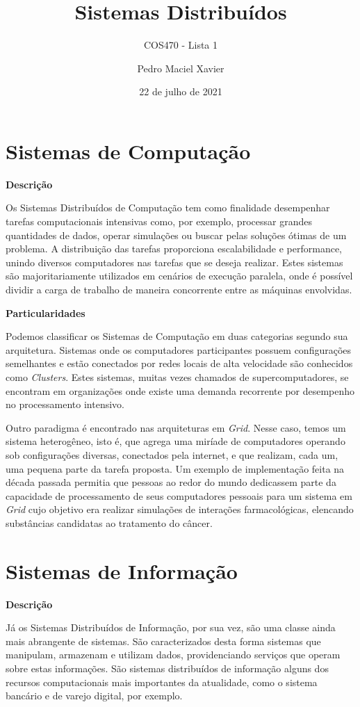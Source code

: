 \documentclass[brazil]{homework}
\title{Sistemas Distribuídos}
\subtitle{COS470 - Lista 1}
\author{Pedro Maciel Xavier}
\date{22 de julho de 2021}
\begin{document}
\maketitle*

\section*{Sistemas de Computação}

\textbf{Descrição}

Os Sistemas Distribuídos de Computação tem como finalidade desempenhar tarefas computacionais intensivas como, por exemplo, processar grandes quantidades de dados, operar simulações ou buscar pelas soluções ótimas de um problema. A distribuição das tarefas proporciona escalabilidade e performance, unindo diversos computadores nas tarefas que se deseja realizar. Estes sistemas são majoritariamente utilizados em cenários de execução paralela, onde é possível dividir a carga de trabalho de maneira concorrente entre as máquinas envolvidas.

\textbf{Particularidades}

Podemos classificar os Sistemas de Computação em duas categorias segundo sua arquitetura. Sistemas onde os computadores participantes possuem configurações semelhantes e estão conectados por redes locais de alta velocidade são conhecidos como \textit{Clusters}. Estes sistemas, muitas vezes chamados de supercomputadores, se encontram em organizações onde existe uma demanda recorrente por desempenho no processamento intensivo.

Outro paradigma é encontrado nas arquiteturas em \textit{Grid}. Nesse caso, temos um sistema heterogêneo, isto é, que agrega uma miríade de computadores operando sob configurações diversas, conectados pela internet, e que realizam, cada um, uma pequena parte da tarefa proposta. Um exemplo de implementação feita na década passada permitia que pessoas ao redor do mundo dedicassem parte da capacidade de processamento de seus computadores pessoais para um sistema em \textit{Grid} cujo objetivo era realizar simulações de interações farmacológicas, elencando substâncias candidatas ao tratamento do câncer.

\section*{Sistemas de Informação}

\textbf{Descrição}

Já os Sistemas Distribuídos de Informação, por sua vez, são uma classe ainda mais abrangente de sistemas. São caracterizados desta forma sistemas que manipulam, armazenam e utilizam dados, providenciando serviços que operam sobre estas informações. São sistemas distribuídos de informação alguns dos recursos computacionais mais importantes da atualidade, como o sistema bancário e de varejo digital, por exemplo.
\end{document}
